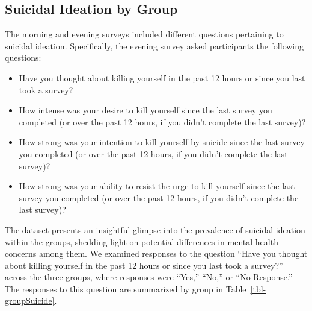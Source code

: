 \documentclass[
  letterpaper,
  number,
  review,
  3p]{elsarticle}
\begin{document}
\subsection{Suicidal Ideation by
Group}\label{suicidal-ideation-by-group}

The morning and evening surveys included different questions pertaining
to suicidal ideation. Specifically, the evening survey asked
participants the following questions:

\begin{itemize}
\item
  Have you thought about killing yourself in the past 12 hours or since
  you last took a survey?
\item
  How intense was your desire to kill yourself since the last survey you
  completed (or over the past 12 hours, if you didn't complete the last
  survey)?
\item
  How strong was your intention to kill yourself by suicide since the
  last survey you completed (or over the past 12 hours, if you didn't
  complete the last survey)?
\item
  How strong was your ability to resist the urge to kill yourself since
  the last survey you completed (or over the past 12 hours, if you
  didn't complete the last survey)?
\end{itemize}

The dataset presents an insightful glimpse into the prevalence of
suicidal ideation within the groups, shedding light on potential
differences in mental health concerns among them. We examined responses
to the question ``Have you thought about killing yourself in the past 12
hours or since you last took a survey?'' across the three groups, where
responses were ``Yes,'' ``No,'' or ``No Response.'' The responses to
this question are summarized by group in Table~\ref{tbl-groupSuicide}.
\end{document}

